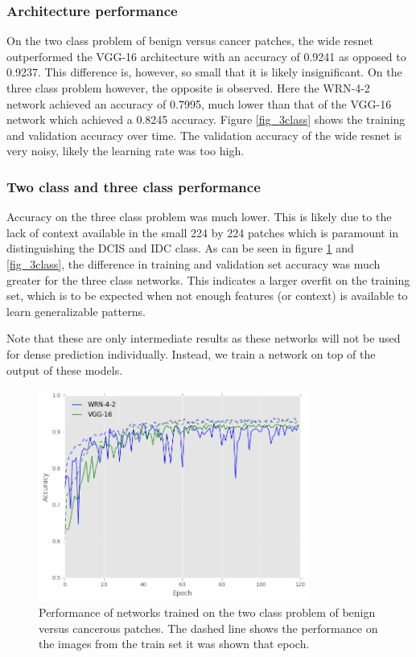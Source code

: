 \documentclass[journal]{IEEEtran}
\begin{document}
\subsubsection{Architecture performance}
On the two class problem of benign versus cancer patches, the wide resnet outperformed the VGG-16 architecture with an accuracy of 0.9241 as opposed to 0.9237. This difference is, however, so small that it is likely insignificant. On the three class problem however, the opposite is observed. Here the WRN-4-2 network achieved an accuracy of 0.7995, much lower than that of the VGG-16 network which achieved a 0.8245 accuracy. Figure \ref{fig_3class} shows the training and validation accuracy over time. The validation accuracy of the wide resnet is very noisy, likely the learning rate was too high.

\subsubsection{Two class and three class performance}
Accuracy on the three class problem was much lower. This is likely due to the lack of context available in the small 224 by 224 patches which is paramount in distinguishing the DCIS and IDC class. As can be seen in figure \ref{fig_2class} and \ref{fig_3class}, the difference in training and validation set accuracy was much greater for the three class networks. This indicates a larger overfit on the training set, which is to be expected when not enough features (or context) is available to learn generalizable patterns.

Note that these are only intermediate results as these networks will not be used for dense prediction individually. Instead, we train a network on top of the output of these models. 

\begin{figure}[!t]
\centering{}
\hspace{-0.3cm}\includegraphics[width=3.5in]{2class_performance}
\vspace{-0.35cm}\caption{Performance of networks trained on the two class problem of benign versus cancerous patches. The dashed line shows the performance on the images from the train set it was shown that epoch.}
\label{fig_2class}
\end{figure}
\end{document}
